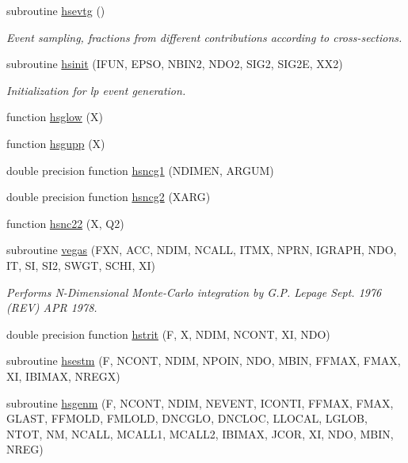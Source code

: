 \begin{DoxyCompactItemize}
\item 
subroutine \hyperlink{djangoh__h_8f_a6dd1f249bd0884f661af22af5b841885}{hsevtg} ()
\begin{DoxyCompactList}\small\item\em Event sampling, fractions from different contributions according to cross-\/sections. \end{DoxyCompactList}\item 
subroutine \hyperlink{djangoh__h_8f_afa43b203c023b0f6b66302ebcdb277f9}{hsinit} (I\+F\+UN, E\+P\+SO, N\+B\+I\+N2, N\+D\+O2, S\+I\+G2, S\+I\+G2E, X\+X2)
\begin{DoxyCompactList}\small\item\em Initialization for lp event generation. \end{DoxyCompactList}\item 
function \hyperlink{djangoh__h_8f_ac1f8273b0185f0cb19a65eb54d54e898}{hsglow} (X)
\item 
function \hyperlink{djangoh__h_8f_a19674849abba63343ab6a1a42dccc95d}{hsgupp} (X)
\item 
double precision function \hyperlink{djangoh__h_8f_a23c10718fac8e43559d484a8630f63e1}{hsncg1} (N\+D\+I\+M\+EN, A\+R\+G\+UM)
\item 
double precision function \hyperlink{djangoh__h_8f_aec9f4d2739afacc2c32f3f9540ae100f}{hsncg2} (X\+A\+RG)
\item 
function \hyperlink{djangoh__h_8f_ad7d53866766435b499ef5948b8d30693}{hsnc22} (X, Q2)
\item 
subroutine \hyperlink{djangoh__h_8f_a750c00ba56a362780036ea85c5cac118}{vegas} (F\+XN, A\+CC, N\+D\+IM, N\+C\+A\+LL, I\+T\+MX, N\+P\+RN, I\+G\+R\+A\+PH, N\+DO, IT, SI, S\+I2, S\+W\+GT, S\+C\+HI, XI)
\begin{DoxyCompactList}\small\item\em Performs N-\/\+Dimensional Monte-\/\+Carlo integration by G.\+P. Lepage Sept. 1976 (R\+EV) A\+PR 1978. \end{DoxyCompactList}\item 
double precision function \hyperlink{djangoh__h_8f_a190b7128662078959f32a6f61d17ef7f}{hstrit} (F, X, N\+D\+IM, N\+C\+O\+NT, XI, N\+DO)
\item 
subroutine \hyperlink{djangoh__h_8f_a3f4574292ce416a17cece3e33361f485}{hsestm} (F, N\+C\+O\+NT, N\+D\+IM, N\+P\+O\+IN, N\+DO, M\+B\+IN, F\+F\+M\+AX, F\+M\+AX, XI, I\+B\+I\+M\+AX, N\+R\+E\+GX)
\item 
subroutine \hyperlink{djangoh__h_8f_a88b74428eb7112a650a7b7444915bdbc}{hsgenm} (F, N\+C\+O\+NT, N\+D\+IM, N\+E\+V\+E\+NT, I\+C\+O\+N\+TI, F\+F\+M\+AX, F\+M\+AX, G\+L\+A\+ST, F\+F\+M\+O\+LD, F\+M\+L\+O\+LD, D\+N\+C\+G\+LO, D\+N\+C\+L\+OC, L\+L\+O\+C\+AL, L\+G\+L\+OB, N\+T\+OT, NM, N\+C\+A\+LL, M\+C\+A\+L\+L1, M\+C\+A\+L\+L2, I\+B\+I\+M\+AX, J\+C\+OR, XI, N\+DO, M\+B\+IN, N\+R\+EG)

\end{DoxyCompactItemize}
